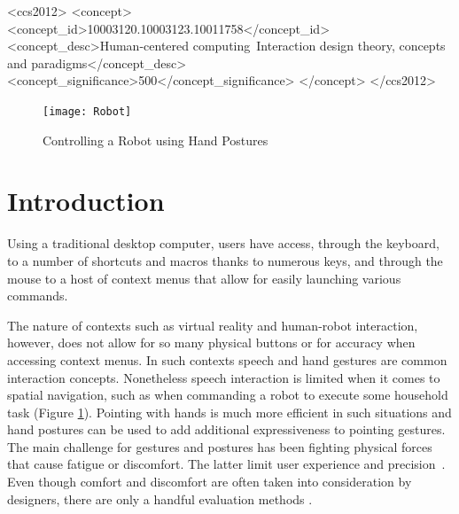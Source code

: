 \documentclass{sig-alternate-05-2015}
\begin{document}
%
%
\begin{CCSXML}
<ccs2012>
<concept>
<concept_id>10003120.10003123.10011758</concept_id>
<concept_desc>Human-centered computing~Interaction design theory, concepts and paradigms</concept_desc>
<concept_significance>500</concept_significance>
</concept>
</ccs2012>
\end{CCSXML}



\begin{figure}
\centering
\texttt{[image: Robot]}
\vspace{-20pt}
\caption{Controlling a Robot using Hand Postures}
\label{fig:Robot}
\vspace{-5pt}
\end{figure}

%
%

%
%
\printccsdesc

\section{Introduction}
Using a traditional desktop computer, users have access, through the keyboard, to a number of shortcuts and macros thanks to numerous keys, and through the mouse to a host of context menus that allow for easily launching various commands. 

The nature of contexts such as virtual reality and human-robot interaction, however, does not allow for so many physical buttons or for accuracy when accessing context menus. In such contexts speech and hand gestures are common interaction concepts. Nonetheless speech interaction is limited when it comes to spatial navigation, such as when commanding a robot to execute some household task (Figure \ref{fig:Robot}). Pointing with hands is much more efficient in such situations and hand postures can be used to add additional expressiveness to pointing gestures. The main challenge for gestures and postures has been fighting physical forces that cause fatigue or discomfort. The latter limit user experience and precision~\cite{short1999precision}. Even though comfort and discomfort are often taken into consideration by designers, there are only a handful evaluation methods \cite{naddeo2015proposal}.
\end{document}
